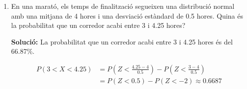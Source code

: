 \documentclass[12pt]{article}
\begin{document}
\begin{exemple} [title=]
\begin{enumerate} [start=15]
    \textbf{Solució:} La probabilitat que una persona tingui un resultat de colesterol entre 185 i 220 mg/dL és del 43.90\%.
    
    \begin{align*}
    P(185 < X < 220) &= P\left(Z< \frac{220 - 200}{30} \right) - P\left(Z< \frac{185 - 200}{30} \right) \\
    &= P(Z< 0.67) - P(Z< -0.5) \approx 0.4390
    \end{align*}


    \item En una marató, els temps de finalització segueixen una distribució normal amb una mitjana de 4 hores i una desviació estàndard de 0.5 hores. Quina és la probabilitat que un corredor acabi entre 3 i 4.25 hores?
    
    \textbf{Solució:} La probabilitat que un corredor acabi entre 3 i 4.25 hores és del 66.87\%.
    
    \begin{align*}
    P(3 < X < 4.25) &= P\left(Z< \frac{4.25 - 4}{0.5} \right) - P\left(Z< \frac{3 - 4}{0.5} \right) \\
    &= P(Z< 0.5) - P(Z< -2) \approx 0.6687  
    \end{align*}
\end{enumerate}
    
\end{exemple}
\end{document}
